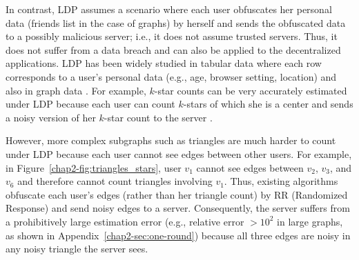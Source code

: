 In contrast, LDP assumes a scenario where each user obfuscates her personal data (friends list in 
the case of graphs) 
by herself and sends the obfuscated data to a possibly malicious server; i.e., it does not assume trusted servers.
Thus, it does not suffer from a data breach and can also be applied to the decentralized applications. 
LDP has been widely studied in tabular data where each row corresponds to a user's personal data (e.g., age, browser setting, location) 
\cite{Acharya_AISTATS19,Bassily_NIPS17,Erlingsson_CCS14,Kairouz_ICML16,Murakami_USENIX19,Wang_USENIX17} 
and also in graph data \cite{Imola_USENIX21,qin2017generating,Ye_ICDE20,Ye_TKDE21}.
For example, $k$-star counts can be very accurately estimated under LDP because each user can count $k$-stars of which she is a center and sends a noisy version of her $k$-star count to the server \cite{Imola_USENIX21}.

However, more complex subgraphs such as triangles are much harder to count under LDP because each user
cannot see
edges between other users.
For example, in Figure~\ref{chap2-fig:triangles_stars}, user $v_1$ cannot see
edges between $v_2$, $v_3$, and $v_6$ 
and therefore 
cannot count triangles involving $v_1$.
Thus,
existing algorithms \cite{Imola_USENIX21,Ye_ICDE20,Ye_TKDE21}
obfuscate each user's edges (rather than her triangle count) by
RR (Randomized Response)
\cite{Warner_JASA65} and send noisy edges to a server.
Consequently, the server suffers from a
prohibitively
large estimation error
(e.g., relative error $> 10^2$ in large graphs, 
as shown in Appendix~\ref{chap2-sec:one-round}) 
because all three edges are noisy in any noisy triangle the server sees.

